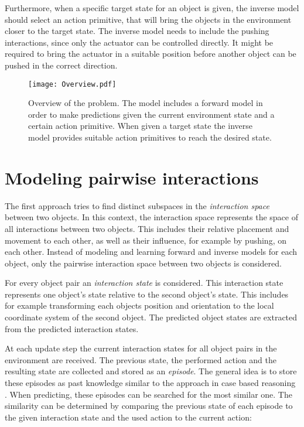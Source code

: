Furthermore, when a specific target state for an object is given, the inverse model should select an action primitive, that will bring the objects in the environment closer to the target state. The inverse model needs to include the pushing interactions, since only the actuator can be controlled directly. It might be required to bring the actuator in a suitable position before another object can be pushed in the correct direction. %

\begin{figure}
	\centering
	\texttt{[image: Overview.pdf]}
	\caption{Overview of the problem. The model includes a forward model in order to make predictions given the current environment state and a certain action primitive. When given a target state the inverse model provides suitable action primitives to reach the desired state.}
	\label{fig:overview}
\end{figure}

\section{Modeling pairwise interactions \label{sec:pairInt}}

The first approach tries to find distinct subspaces in the \textit{interaction space} between two objects. In this context, the interaction space represents the space of all interactions between two objects. This includes their relative placement and movement to each other, as well as their influence, for example by pushing, on each other. Instead of modeling and learning forward and inverse models for each object, only the pairwise interaction space between two objects is considered.  

For every object pair an \textit{interaction state} is considered. This interaction state represents one object's state relative to the second object's state. This includes for example transforming each objects position and orientation to the local coordinate system of the second object. %
The predicted object states are extracted from the predicted interaction states.

At each update step the current interaction states for all object pairs in the environment are received. The previous state, the performed action and the resulting state are collected and stored as an \textit{episode}. The general idea is to store these episodes as past knowledge similar to the approach in case based reasoning \cite{cbr}. When predicting, these episodes can be searched for the most similar one. The similarity can be determined by comparing the previous state of each episode to the given interaction state and the used action to the current action:

